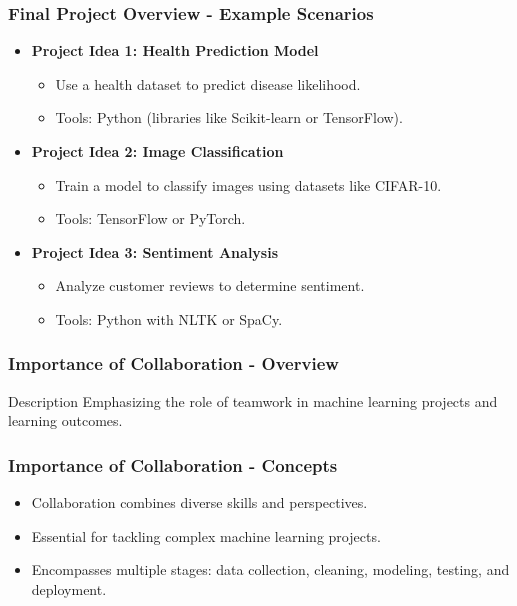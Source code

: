 \documentclass[aspectratio=169]{beamer}
\begin{document}
\begin{frame}[fragile]
    \frametitle{Final Project Overview - Example Scenarios}
    \begin{itemize}
        \item \textbf{Project Idea 1: Health Prediction Model}
        \begin{itemize}
            \item Use a health dataset to predict disease likelihood.
            \item Tools: Python (libraries like Scikit-learn or TensorFlow).
        \end{itemize}

        \item \textbf{Project Idea 2: Image Classification}
        \begin{itemize}
            \item Train a model to classify images using datasets like CIFAR-10.
            \item Tools: TensorFlow or PyTorch.
        \end{itemize}

        \item \textbf{Project Idea 3: Sentiment Analysis}
        \begin{itemize}
            \item Analyze customer reviews to determine sentiment.
            \item Tools: Python with NLTK or SpaCy.
        \end{itemize}
    \end{itemize}
\end{frame}

\begin{frame}[fragile]
    \frametitle{Importance of Collaboration - Overview}
    \begin{block}{Description}
        Emphasizing the role of teamwork in machine learning projects and learning outcomes.
    \end{block}
\end{frame}

\begin{frame}[fragile]
    \frametitle{Importance of Collaboration - Concepts}
    \begin{itemize}
        \item Collaboration combines diverse skills and perspectives.
        \item Essential for tackling complex machine learning projects.
        \item Encompasses multiple stages: data collection, cleaning, modeling, testing, and deployment.
    \end{itemize}
\end{frame}
\end{document}
